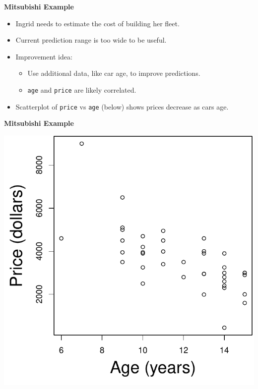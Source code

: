 \documentclass[landscape]{slides}
\newcommand{\heading}[1]{%
  \begin{center}
    \large\bf \color{red}
        #1
  \end{center}
  \vspace{1ex minus 1ex}}
\begin{document}
\begin{slide}
	\heading{Mitsubishi Example}
	
	\begin{itemize}
		\item Ingrid needs to estimate the cost of building her fleet.
		\item Current prediction range is too wide to be useful.
		
		\item Improvement idea:
		\begin{itemize}
			\item Use additional data, like car age, to improve predictions.
			\item {\tt age} and {\tt price} are likely correlated.
		\end{itemize}
		
		\item Scatterplot of {\tt price} vs {\tt age} (below) shows prices decrease as cars age. %
	\end{itemize}
	
\end{slide}


\begin{slide}
\heading{Mitsubishi Example}

\begin{center}
\includegraphics{figures/7-LinearModels-Figures/ageprice.pdf}
\end{center}
\end{slide}
\end{document}
